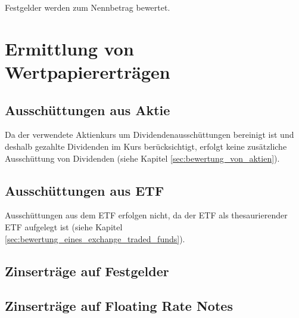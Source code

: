 \documentclass[12pt, a4paper]{article}
\begin{document}
Festgelder werden zum Nennbetrag bewertet.


\section{Ermittlung von Wertpapiererträgen}
\label{sec:ermittlung_von_wertpapierertraegen}

\subsection{Ausschüttungen aus Aktie}
\label{sec:ausschuettung_aus_aktie}
Da der verwendete Aktienkurs um Dividendenausschüttungen bereinigt ist und deshalb gezahlte Dividenden im Kurs berücksichtigt, erfolgt keine zusätzliche Ausschüttung von Dividenden (siehe Kapitel \ref{sec:bewertung_von_aktien}).

\subsection{Ausschüttungen aus ETF}
\label{sec:ausschuettungen_aus_etf}
Ausschüttungen aus dem ETF erfolgen nicht, da der {ETF} als thesaurierender {ETF} aufgelegt ist (siehe Kapitel \ref{sec:bewertung_eines_exchange_traded_funds}).

\subsection{Zinserträge auf Festgelder}
\label{sec:zinsertraege_auf_festgelder}



\subsection{Zinserträge auf Floating Rate Notes}
\label{sec:zinsertraege_auf_floating_rate_notes}

\printbibliography[title={Literatur}]
\end{document}
